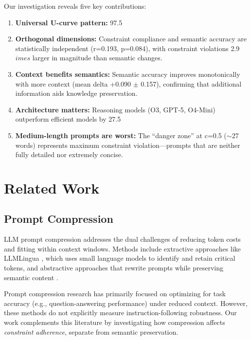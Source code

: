 \documentclass[11pt]{article}
\begin{document}
Our investigation reveals five key contributions:

\begin{enumerate}
\item \textbf{Universal U-curve pattern:} 97.5%
\item \textbf{Orthogonal dimensions:} Constraint compliance and semantic accuracy are statistically independent (r=0.193, p=0.084), with constraint violations 2.9$	imes$ larger in magnitude than semantic changes.
\item \textbf{Context benefits semantics:} Semantic accuracy improves monotonically with more context (mean delta +0.090 $\pm$ 0.157), confirming that additional information aids knowledge preservation.
\item \textbf{Architecture matters:} Reasoning models (O3, GPT-5, O4-Mini) outperform efficient models by 27.5%
\item \textbf{Medium-length prompts are worst:} The ``danger zone'' at c=0.5 ($\sim$27 words) represents maximum constraint violation---prompts that are neither fully detailed nor extremely concise.
\end{enumerate}

\section{Related Work}

\subsection{Prompt Compression}

LLM prompt compression addresses the dual challenges of reducing token costs and fitting within context windows. Methods include extractive approaches like LLMLingua \citep{jiang2023longllmlingua}, which uses small language models to identify and retain critical tokens, and abstractive approaches that rewrite prompts while preserving semantic content \citep{chevalier2023adapting}.

Prompt compression research has primarily focused on optimizing for task accuracy (e.g., question-answering performance) under reduced context. However, these methods do not explicitly measure instruction-following robustness. Our work complements this literature by investigating how compression affects \textit{constraint adherence}, separate from semantic preservation.
\end{document}
